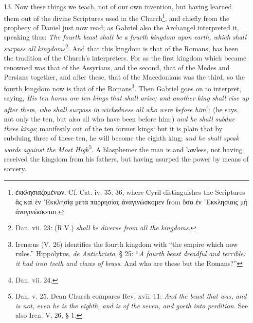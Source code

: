 13. Now these things we teach, not of our own invention, but having learned them out of the divine Scriptures used in the Church\footnote{\textgreek{ἐκκλησιαζομένων}. Cf. Cat. iv. 35, 36, where Cyril distinguishes the Scriptures \textgreek{ἃς καὶ ἐν ᾽Εκκλησίᾳ μετὰ παρρησίας ἀναγινώσκομεν} from \textgreek{ὅσα ἐν ᾽Εκκλησίαις μὴ ἀναγινώσκεται}.}, and chiefly from the prophecy of Daniel just now read; as Gabriel also the Archangel interpreted it, speaking thus: \emph{The fourth beast shall be a fourth kingdom upon earth, which shall surpass all kingdoms}\footnote{Dan. vii. 23: (R.V.) \emph{shall be diverse from all the kingdoms}.}. And that this kingdom is that of the Romans, has been the tradition of the Church’s interpreters. For as the first kingdom which became renowned was that of the Assyrians, and the second, that of the Medes and Persians together, and after these, that of the Macedonians was the third, so the fourth kingdom now is that of the Romans\footnote{Irenæus (V. 26) identifies the fourth kingdom with “the empire which now rules.” Hippolytus, \emph{de Antichristo}, § 25: “\emph{A fourth beast dreadful and terrible: it had iron teeth and claws of brass}. And who are these but the Romans?”}. Then Gabriel goes on to interpret, saying, \emph{His ten horns are ten kings that shall arise; and another king shall rise up after them, who shall surpass in wickedness all who were before him}\footnote{Dan. vii. 24.}; (he says, not only the ten, but also all who have been before him;) \emph{and he shall subdue three kings}; manifestly out of the ten former kings: but it is plain that by subduing three of these ten, he will become the eighth king; \emph{and he shall speak words against the Most High}\footnote{Dan. v. 25. Dean Church compares Rev. xvii. 11: \emph{And the beast that was, and is not, even he is the eighth, and is of the seven, and goeth into perdition}. See also Iren. V. 26, § 1.}. A blasphemer the man is and lawless, not having received the kingdom from his fathers, but having usurped the power by means of sorcery.

